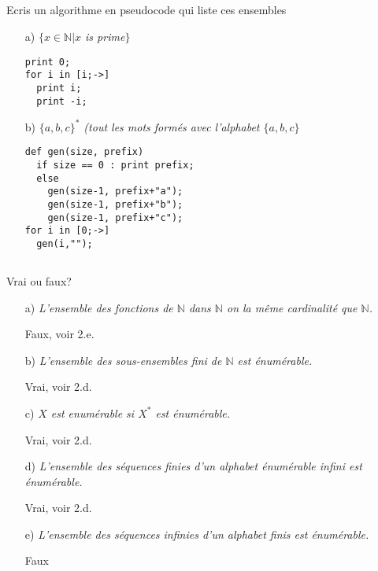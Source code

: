 \subsection{}

Ecris un algorithme en pseudocode qui liste ces ensembles

\begin{itemize}
	\item[a)]\textit{$\{x\in\mathbb{N}|x$ is prime$\}$}
	
	\begin{lstlisting}[frame=single]
print 0;
for i in [i;->]
  print i;
  print -i;
	\end{lstlisting}	
	
	\item[b)]\textit{$\{a,b,c\}^*$ (tout les mots formés avec l'alphabet $\{a,b,c\}$}
	
	\begin{lstlisting}[frame=single]
def gen(size, prefix)
  if size == 0 : print prefix;
  else
    gen(size-1, prefix+"a");
    gen(size-1, prefix+"b");
    gen(size-1, prefix+"c");
for i in [0;->]
  gen(i,"");
	\end{lstlisting}	
\end{itemize}

\subsection{}
\nosolution

\subsection{}
Vrai ou faux?
\begin{itemize}
	\item[a)]\textit{L'ensemble des fonctions de $\mathbb{N}$ dans $\mathbb{N}$ on la même cardinalité que $\mathbb{N}$.}

	Faux, voir 2.e.	
	
	\item[b)]\textit{L'ensemble des sous-ensembles fini de $\mathbb{N}$ est énumérable.}

	Vrai, voir 2.d.		
	
	\item[c)]\textit{$X$ est enumérable si $X^*$ est énumérable.}
	
	Vrai, voir 2.d.		
	
	\item[d)]\textit{L'ensemble des séquences finies d'un alphabet énumérable infini est énumérable.}

	Vrai, voir 2.d.		
		
	\item[e)]\textit{L'ensemble des séquences infinies d'un alphabet finis est énumérable.}
	
	Faux
\end{itemize}
